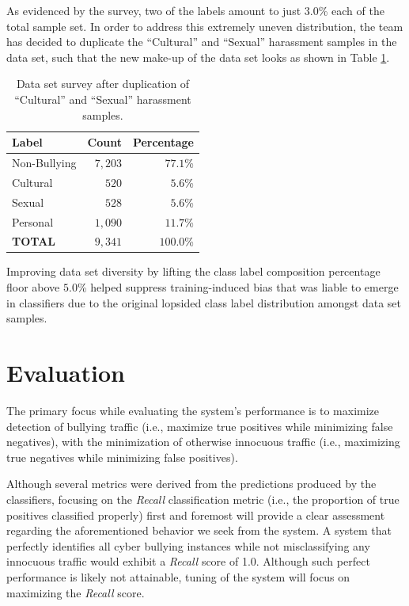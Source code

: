 \documentclass[conference]{sig-alternate-05-2015}
\begin{document}
As evidenced by the survey, two of the labels amount to just $3.0$\% each of the
total sample set. In order to address this extremely uneven distribution, the
team has decided to duplicate the ``Cultural'' and ``Sexual'' harassment samples
in the data set, such that the new make-up of the data set looks as shown in
Table \ref{tab:dataset_survey_final}.

\begin{table}[h!]
  \centering
  \begin{tabular}{| l | r | r |}
    \hline
    Label & Count & Percentage \\
    \hline\hline
    Non-Bullying & $7,203$ & $77.1$\% \\
    \hline
    Cultural & $520$ & $5.6$\% \\
    \hline
    Sexual & $528$ & $5.6$\% \\
    \hline
    Personal & $1,090$ & $11.7$\% \\
    \hline\hline
    \textbf{TOTAL} & $9,341$ & $100.0$\% \\
    \hline
  \end{tabular}
  \caption{Data set survey after duplication of ``Cultural'' and ``Sexual''
  harassment samples.}
  \label{tab:dataset_survey_final}
\end{table}

Improving data set diversity by lifting the class label composition percentage
floor above $5.0$\% helped suppress training-induced bias that was liable to
emerge in classifiers due to the original lopsided class label distribution
amongst data set samples.

\section{Evaluation}\label{sec:evaluation}

The primary focus while evaluating the system's performance is to maximize
detection of bullying traffic (i.e., maximize true positives while minimizing
false negatives), with the minimization of otherwise innocuous traffic (i.e.,
maximizing true negatives while minimizing false positives).

Although several metrics were derived from the predictions produced by the
classifiers, focusing on the \textit{Recall} classification metric
(i.e., the proportion of true positives classified properly) first and foremost
will provide a clear assessment regarding the aforementioned behavior we seek
from the system. A system that perfectly identifies all cyber bullying instances
while not misclassifying any innocuous traffic would exhibit a \textit{Recall}
score of 1.0. Although such perfect performance is likely not attainable, tuning
of the system will focus on maximizing the \textit{Recall} score.
\end{document}
